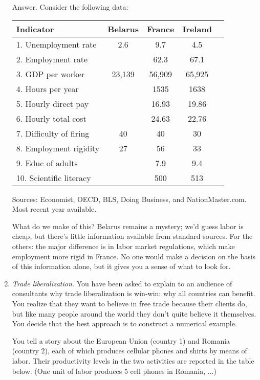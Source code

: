 \documentclass[letterpaper,12pt]{article}
\begin{document}
\begin{enumerate}
Answer.  Consider the following data:  

\begin{center}
\begin{tabular}{lcccc}
\hline\hline
Indicator   & Belarus & France & Ireland  \\
\hline\hline 
1. Unemployment rate & 2.6 & 9.7  &  4.5   \\

2. Employment rate   & & 62.3 & 67.1  \\
3. GDP per worker    & 23,139 & 56,909 & 65,925\\
4. Hours per year    & & 1535 & 1638  \\
5. Hourly direct pay & & 16.93  & 19.86  \\
6. Hourly total cost & & 24.63  &  22.76   \\
7. Difficulty of firing & 40  & 40 & 30  \\
8. Employment rigidity & 27 & 56 & 33  \\
9. Educ of adults    &  &  7.9   &  9.4 \\
10. Scientific literacy &   & 500 & 513  \\
\hline\hline 
\end{tabular}
\end{center}
Sources:  Economist, OECD, 
BLS, Doing Business, and NationMaster.com.  
Most recent year available.   

What do we make of this?  
Belarus remains a mystery;
we'd guess labor is cheap, 
but there's little information available from standard sources. 
For the others:  the major difference 
is in labor market regulations, which make employment 
more rigid in France.  
No one would make a decision on the basis of this information alone, 
but it gives you a sense of what to look for.  

\item {\it Trade liberalization.} You have been asked to explain
to an audience of consultants why trade liberalization is win-win:  
why all countries can benefit.  
You realize that they want to
believe in free trade because their clients do, but like many
people around the world they don't quite believe it themselves.
You decide that the best approach is to construct a numerical
example.

You tell a story about the European Union (country 1) and Romania
(country 2), each of which produces cellular phones and shirts by
means of labor.  Their productivity levels in the two activities
are reported in the table below. (One unit of labor produces 5
cell phones in Romania, ...)
\begin{center}


\end{center}
\end{enumerate}
\end{document}
